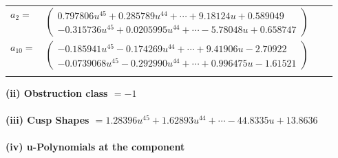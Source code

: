 \documentclass[1p]{elsarticle_modified}
\theoremstyle{definition}
\begin{document}
\begin{tabular}{m{7pt} m{180pt} m{7pt} m{180pt} }
\flushright $a_{2}=$&$\begin{pmatrix}0.797806 u^{45}+0.285789 u^{44}+\cdots+9.18124 u+0.589049\\-0.315736 u^{45}+0.0205995 u^{44}+\cdots-5.78048 u+0.658747\end{pmatrix}$ \\
\flushright $a_{10}=$&$\begin{pmatrix}-0.185941 u^{45}-0.174269 u^{44}+\cdots+9.41906 u-2.70922\\-0.0739068 u^{45}-0.292990 u^{44}+\cdots+0.996475 u-1.61521\end{pmatrix}$\\&\end{tabular}
\flushleft \textbf{(ii) Obstruction class $= -1$}\\~\\
\flushleft \textbf{(iii) Cusp Shapes $= 1.28396 u^{45}+1.62893 u^{44}+\cdots-44.8335 u+13.8636$}\\~\\
\newpage\renewcommand{\arraystretch}{1}
\flushleft \textbf{(iv) u-Polynomials at the component}\newline \\
\end{document}
